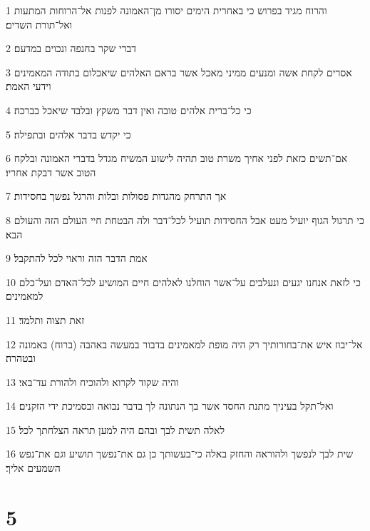 \par 1 והרוח מגיד בפרוש כי באחרית הימים יסורו מן־האמונה לפנות אל־הרוחות המתעות ואל־תורת השדים׃
\par 2 דברי שקר בחנפה ונכוים במדעם׃
\par 3 אסרים לקחת אשה ומנעים ממיני מאכל אשר בראם האלהים שיאכלום בתודה המאמינים וידעי האמת׃
\par 4 כי כל־ברית אלהים טובה ואין דבר משקץ ובלבד שיאכל בברכה׃
\par 5 כי יקדש בדבר אלהים ובתפילה׃
\par 6 אם־תשים כזאת לפני אחיך משרת טוב תהיה לישוע המשיח מגדל בדברי האמונה ובלקח הטוב אשר דבקת אחריו׃
\par 7 אך התרחק מהגדות פסולות ובלות והרגל נפשך בחסידות׃
\par 8 כי תרגול הגוף יועיל מעט אבל החסידות תועיל לכל־דבר ולה הבטחת חיי העולם הזה והעולם הבא׃
\par 9 אמת הדבר הזה וראוי לכל להתקבל׃
\par 10 כי לזאת אנחנו יגעים ונעלבים על־אשר הוחלנו לאלהים חיים המושיע לכל־האדם ועל־כלם למאמינים׃
\par 11 זאת תצוה ותלמד׃
\par 12 אל־יבוז איש את־בחורותיך רק היה מופת למאמינים בדבור במעשה באהבה (ברוח) באמונה ובטהרה׃
\par 13 והיה שקוד לקרוא ולהוכיח ולהורת עד־באי׃
\par 14 ואל־תקל בעיניך מתנת החסד אשר בך הנתונה לך בדבר נבואה ובסמיכת ידי הזקנים׃
\par 15 לאלה תשית לבך ובהם היה למען תראה הצלחתך לכל׃
\par 16 שית לבך לנפשך ולהוראה והחזק באלה כי־בעשותך כן גם את־נפשך תושיע וגם את־נפש השמעים אליך׃

\chapter{5}

